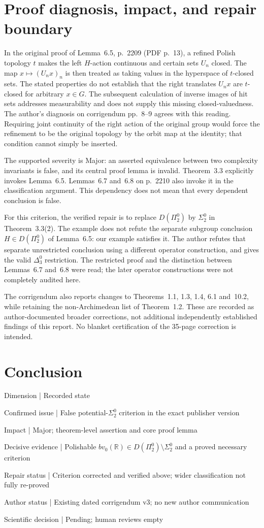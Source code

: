 \documentclass[10pt]{article}
\begin{document}
\section*{Proof diagnosis, impact, and repair boundary}
In the original proof of Lemma 6.5, p. 2209 (PDF p. 13), a refined Polish topology \(t\) makes the left \(H\)-action continuous and certain sets \(U_n\) closed. The map \(x\mapsto(U_nx)_n\) is then treated as taking values in the hyperspace of \(t\)-closed sets. The stated properties do not establish that the right translates \(U_nx\) are \(t\)-closed for arbitrary \(x\in G\). The subsequent calculation of inverse images of hit sets addresses measurability and does not supply this missing closed-valuedness. The author’s diagnosis on corrigendum pp. 8–9 agrees with this reading. Requiring joint continuity of the right action of the original group would force the refinement to be the original topology by the orbit map at the identity; that condition cannot simply be inserted.\par
The supported severity is Major: an asserted equivalence between two complexity invariants is false, and its central proof lemma is invalid. Theorem 3.3 explicitly invokes Lemma 6.5. Lemmas 6.7 and 6.8 on p. 2210 also invoke it in the classification argument. This dependency does not mean that every dependent conclusion is false.\par
For this criterion, the verified repair is to replace \(D(\Pi^0_2)\) by \(\Sigma^0_2\) in Theorem 3.3(2). The example does not refute the separate subgroup conclusion \(H\in D(\Pi^0_2)\) of Lemma 6.5: our example satisfies it. The author refutes that separate unrestricted conclusion using a different operator construction, and gives the valid \(\Delta^0_3\) restriction. The restricted proof and the distinction between Lemmas 6.7 and 6.8 were read; the later operator constructions were not completely audited here.\par
The corrigendum also reports changes to Theorems 1.1, 1.3, 1.4, 6.1 and 10.2, while retaining the non-Archimedean list of Theorem 1.2. These are recorded as author-documented broader corrections, not additional independently established findings of this report. No blanket certification of the 35-page correction is intended.\par
\section*{Conclusion}
Dimension | Recorded state\par
Confirmed issue | False potential-\(\Sigma^0_2\) criterion in the exact publisher version\par
Impact | Major; theorem-level assertion and core proof lemma\par
Decisive evidence | Polishable \(bv_0(\mathbb R)\in D(\Pi^0_2)\setminus\Sigma^0_2\) and a proved necessary criterion\par
Repair status | Criterion corrected and verified above; wider classification not fully re-proved\par
Author status | Existing dated corrigendum v3; no new author communication\par
Scientific decision | Pending; human reviews empty\par
\end{document}
